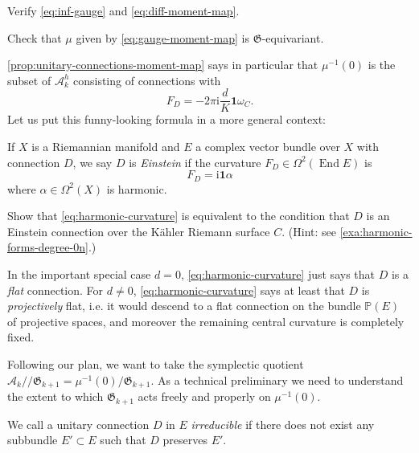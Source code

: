 \documentclass[12pt,letterpaper,reqno]{article}
\numberwithin{equation}{section}
\newcommand{\fG}{{\mathfrak G}}
\newcommand{\cA}{\ensuremath{\mathcal A}}
\newcommand{\PP}{\ensuremath{\mathbb P}}
\newcommand{\kahler}{K\"ahler\xspace}
\newcommand{\kq}{/\!\!/}
\newcommand{\I}{{\mathrm i}}
\newcommand\bid{{\mathbf 1}}
\newcommand{\ti}[1]{\textit{#1}}
\DeclareMathOperator{\End}{End}
\begin{document}
\begin{exercise}
Verify \eqref{eq:inf-gauge} and \eqref{eq:diff-moment-map}.
\end{exercise}

\begin{exercise}
Check that $\mu$ given by \eqref{eq:gauge-moment-map}
is $\fG$-equivariant.
\end{exercise}

\autoref{prop:unitary-connections-moment-map} says in particular that 
$\mu^{-1}(0)$ is the subset of $\cA^h_k$
consisting of connections with
\begin{equation} \label{eq:harmonic-curvature}
  F_D = -2 \pi \I \frac{d}{K} \bid \omega_C.
\end{equation}
Let us put this funny-looking formula in a more general context:

\begin{defn} 
If $X$ is a Riemannian manifold and $E$ a complex
vector bundle over $X$ with connection $D$, we say $D$ is 
\ti{Einstein} if the curvature $F_D \in \Omega^2(\End E)$
is
\begin{equation}
  F_D = \I \bid \alpha
\end{equation}
where $\alpha \in \Omega^2(X)$ is harmonic.
\end{defn}

\begin{exercise} Show that \eqref{eq:harmonic-curvature}
is equivalent to the condition that $D$ is an Einstein 
connection over the \kahler Riemann surface $C$.
(Hint: see \autoref{exa:harmonic-forms-degree-0n}.)
\end{exercise}

In the important special case $d=0$, \eqref{eq:harmonic-curvature}
just says that $D$ is a \ti{flat} connection.
For $d \neq 0$, \eqref{eq:harmonic-curvature} says at least that $D$ is
\ti{projectively} flat, i.e. it would descend to a flat connection 
on the bundle $\PP(E)$ of projective spaces, and moreover the remaining
central curvature is completely fixed.

Following our plan, 
we want to take the symplectic quotient $\cA_k \kq \fG_{k+1} = \mu^{-1}(0) / \fG_{k+1}$.
As a technical preliminary we need to understand the extent to 
which $\fG_{k+1}$ acts freely and properly on $\mu^{-1}(0)$.

\begin{defn}
We call a unitary connection $D$ in $E$ \ti{irreducible} if there does not
exist any subbundle $E' \subset E$ such that $D$ preserves $E'$.
\end{defn}
\end{document}
